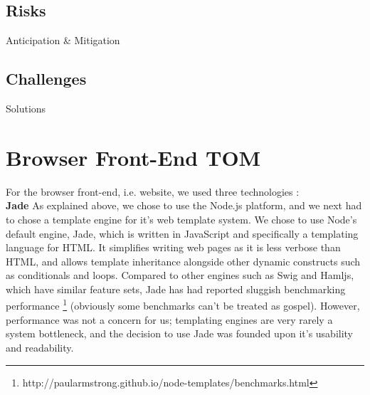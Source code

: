 \begin{center}
\end{center}

\subsection{Risks}
Anticipation \& Mitigation

\subsection{Challenges}
Solutions

\section{Browser Front-End {\color{red} TOM}}

For the browser front-end, i.e. website, we used three technologies : 
\\

\noindent
{\bf Jade}  \hspace*{2mm} 
As explained above, we chose to use the Node.js platform, and we next had to chose a template engine for it's web template system. We chose to use Node's default engine, Jade, which is written in JavaScript and specifically a templating language for HTML. It simplifies writing web pages as it is less verbose than HTML, and allows  template inheritance alongside other dynamic constructs such as conditionals and loops. Compared to other engines such as Swig and Hamljs, which have similar feature sets, Jade has had reported sluggish benchmarking performance \footnote{http://paularmstrong.github.io/node-templates/benchmarks.html} (obviously some benchmarks can't be treated as gospel). However, performance was not a concern for us; templating engines are very rarely a system bottleneck, and the decision to use Jade was founded upon it's usability and readability.
\\

